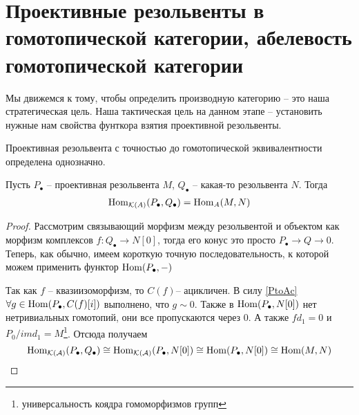 \section{Проективные резольвенты в гомотопической категории, абелевость гомотопической категории}
Мы движемся к тому, чтобы определить производную категорию -- это наша стратегическая цель. Наша тактическая цель на данном этапе -- установить  нужные нам свойства фунткора взятия проективной резольвенты.
\begin{to_com}
Проективная резольвента с точностью до гомотопической эквивалентности определена однозначно.
\end{to_com}
\begin{to_suj}
Пусть $P_\bullet$ -- проективная резольвента $M$, $Q_\bullet$ -- какая-то резольвента $N$.
Тогда 
\begin{align*}
\operatorname{Hom}_{\mathcal{K}(A)}(P_\bullet, Q_\bullet) = \operatorname{Hom}_{A}(M, N)
\end{align*}
\end{to_suj}
\begin{proof}
Рассмотрим связывающий морфизм между резольвентой и объектом как морфизм комплексов $f\colon Q_\bullet \to N[0] $, тогда его конус это просто $P_\bullet\to Q \to 0$. Теперь, как обычно, имеем короткую точную последовательность, к которой можем применить функтор $\operatorname{Hom}(P_\bullet, - )$
\bee
{}
\eee
\bee
{}
\eee
Так как $f$ -- квазиизоморфизм, то $C(f)$-- ацикличен. В силу \ref{PtoAc} $\forall g \in \operatorname{Hom}(P_\bullet, C(f)[i])$ выполнено, что $g \sim 0$. Также в $\operatorname{Hom}(P_\bullet, N[0])$ нет нетривиальных гомотопий, они все пропускаются через 0. А также $f d_1 = 0$ и $P_0/im d_1 = M$\footnote{универсальность коядра гомоморфизмов групп}. Отсюда получаем
\[
\operatorname{Hom}_{\mathcal{K(A)}}(P_\bullet, Q_\bullet) \cong \operatorname{Hom}_{\mathcal{K(A)}}(P_\bullet, N[0]) \cong \operatorname{Hom}(P_\bullet, N[0]) \cong \operatorname{Hom}(M, N)
\]
\end{proof}
